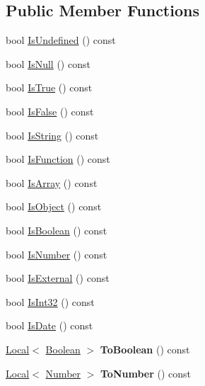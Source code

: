 \subsection*{Public Member Functions}
\begin{DoxyCompactItemize}
\item 
bool \hyperlink{classv8_1_1_value_aea287b745656baa8a12a2ae1d69744b6}{Is\+Undefined} () const 
\item 
bool \hyperlink{classv8_1_1_value_aa2c6ed8ef832223a7e2cd81e6ac61c78}{Is\+Null} () const 
\item 
bool \hyperlink{classv8_1_1_value_a8f27462322186b295195eecb3e81d6d7}{Is\+True} () const 
\item 
bool \hyperlink{classv8_1_1_value_a68c0296071d01ca899825d7643cf495a}{Is\+False} () const 
\item 
bool \hyperlink{classv8_1_1_value_ab23a34b7df62806808e01b0908bf5f00}{Is\+String} () const 
\item 
bool \hyperlink{classv8_1_1_value_a05532a34cdd215f273163830ed8b77e7}{Is\+Function} () const 
\item 
bool \hyperlink{classv8_1_1_value_aaee0b144087d20eae02314c9393ff80f}{Is\+Array} () const 
\item 
bool \hyperlink{classv8_1_1_value_a355b7991c5c978c0341f6f961b63c5a2}{Is\+Object} () const 
\item 
bool \hyperlink{classv8_1_1_value_a0aceb7645e71b096df5cd73d1252b1b0}{Is\+Boolean} () const 
\item 
bool \hyperlink{classv8_1_1_value_a1bd51e3e55f67c65b9a8f587fbffb7c7}{Is\+Number} () const 
\item 
bool \hyperlink{classv8_1_1_value_a7ac61a325c18af8dcb6d7d5bf47d2503}{Is\+External} () const 
\item 
bool \hyperlink{classv8_1_1_value_a01e1db51c65b2feace248b7acbf71a2c}{Is\+Int32} () const 
\item 
bool \hyperlink{classv8_1_1_value_a8bc11fab0aded4a805722ab6df173cae}{Is\+Date} () const 
\item 
\hypertarget{classv8_1_1_value_a73d653dc4a4999ce7258b40a4d8a1510}{}\hyperlink{classv8_1_1_local}{Local}$<$ \hyperlink{classv8_1_1_boolean}{Boolean} $>$ {\bfseries To\+Boolean} () const \label{classv8_1_1_value_a73d653dc4a4999ce7258b40a4d8a1510}

\item 
\hypertarget{classv8_1_1_value_a2706d2c0cf684a5179e76e8e404b3a5d}{}\hyperlink{classv8_1_1_local}{Local}$<$ \hyperlink{classv8_1_1_number}{Number} $>$ {\bfseries To\+Number} () const \label{classv8_1_1_value_a2706d2c0cf684a5179e76e8e404b3a5d}


\end{DoxyCompactItemize}
